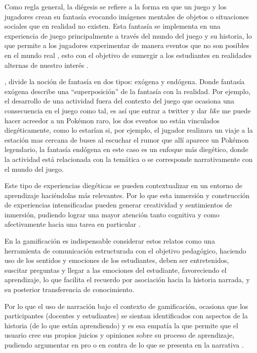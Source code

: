 Como regla general, la diégesis se refiere a la forma en que un juego y los jugadores crean su fantasía
evocando imágenes mentales de objetos o situaciones sociales que en realidad no existen. Esta fantasía se 
implementa en una experiencia de juego principalmente a través del mundo del juego y su historia, lo que 
permite a los jugadores experimentar de manera eventos que no son posibles en el mundo real
\cite{PRESTOPNIK2015492}, esto con el objetivo de sumergir a los estudiantes en realidades alternas de 
nuestro interés \cite{AURA2021101728}.

, divide la noción de fantasía en dos tipos: exógena y endógena. Donde fantasía
exógena describe una ``superposición'' de la fantasía con la realidad. Por ejemplo, el desarrollo de una
actividad fuera del contexto del juego que ocasiona una consecuencia en el juego como tal, es así que entrar
a twitter y dar \textit{like} me puede hacer acreedor a un Pokémon raro, los dos eventos no están vinculados 
diegéticamente, como lo estarían si, por ejemplo, el jugador realizara un viaje a la estación mas cercana 
de buses al escuchar el rumor que allí aparece un Pokémon legendario, la fantasía endógena en este caso es 
un enfoque más diegético, donde la actividad está relacionada con la temática o se corresponde
narrativamente con el mundo del juego.

Este tipo de experiencias diegéticas se pueden contextualizar en un entorno de aprendizaje haciéndolas más 
relevantes. Por lo que esta inmersión y construcción de experiencias intensificadas pueden generar 
creatividad y sentimientos de inmersión, pudiendo lograr una mayor atención tanto cognitiva y como 
afectivamente hacia una tarea en particular \cite{AURA2021101728}.

En la gamificación es indispensable considerar estos relatos como una herramienta de comunicación estructurada
con el objetivo pedagógico, haciendo uso de los sentidos y emociones de los estudiantes, deben ser 
entretenidos, suscitar preguntas y llegar a las emociones del estudiante, favoreciendo el aprendizaje, lo que 
facilita el recuerdo por asociación hacia la historia narrada, y su posterior transferencia de conocimiento.

Por lo que el uso de narración bajo el contexto de gamificación, ocasiona que los participantes (docentes y
estudiantes) se sientan identificados con aspectos de la historia (de lo que están aprendiendo) y es esa
empatía la que permite que el usuario cree sus propios juicios y opiniones sobre su proceso de aprendizaje,
pudiendo argumentar en pro o en contra de lo que se presenta en la narrativa \cite{tornero2016ideas}.

